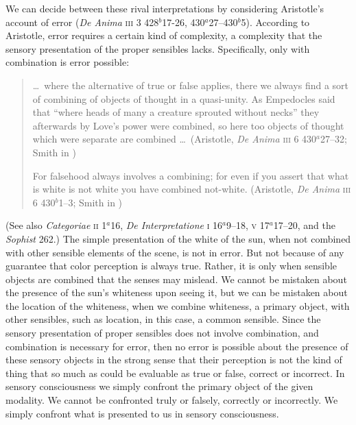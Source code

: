 \documentclass[12pt]{article}
\begin{document}
We can decide between these rival interpretations by considering Aristotle's account of error (\emph{De Anima} \textsc{iii} 3 428\( ^{b} \)17-26, 430\( ^{a} \)27--430\( ^{b} \)5). According to Aristotle, error requires a certain kind of complexity, a complexity that the sensory presentation of the proper sensibles lacks. Specifically, only with combination is error possible:
\begin{quote}
	\ldots\ where the alternative of true or false applies, there we always find a sort of combining of objects of thought in a quasi-unity. As Empedocles said that ``where heads of many a creature sprouted without necks'' they afterwards by Love’s power were combined, so here too objects of thought which were separate are combined \ldots\ (Aristotle, \emph{De Anima} \textsc{iii} 6 430\( ^{a} \)27--32; Smith in \citealt[54]{Barnes:1984uq})
	
	For falsehood always involves a combining; for even if you assert that what is white is not white you have combined not-white. (Aristotle, \emph{De Anima} \textsc{iii} 6 430\( ^{b} \)1--3; Smith in \citealt[54]{Barnes:1984uq})
\end{quote}
(See also \emph{Categoriae} \textsc{ii} 1\( ^{a} \)16, \emph{De Interpretatione} \textsc{i} 16\( ^{a} \)9--18, \textsc{v} 17\( ^{a} \)17--20, and the \emph{Sophist} 262.) The simple presentation of the white of the sun, when not combined with other sensible elements of the scene, is not in error. But not because of any guarantee that color perception is always true. Rather, it is only when sensible objects are combined that the senses may mislead. We cannot be mistaken about the presence of the sun's whiteness upon seeing it, but we can be mistaken about the location of the whiteness, when we combine whiteness, a primary object, with other sensibles, such as location, in this case, a common sensible. Since the sensory presentation of proper sensibles does not involve combination, and combination is necessary for error, then no error is possible about the presence of these sensory objects in the strong sense that their perception is not the kind of thing that so much as could be evaluable as true or false, correct or incorrect. In sensory consciousness we simply confront the primary object of the given modality. We cannot be confronted truly or falsely, correctly or incorrectly. We simply confront what is presented to us in sensory consciousness. 
\end{document}
